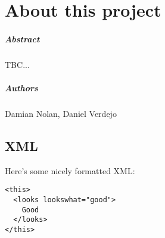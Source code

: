 
\chapter*{About this project}
\paragraph{Abstract}

TBC...

\paragraph{Authors}
Damian Nolan, Daniel Verdejo






\section{XML}
Here's some nicely formatted XML:
\begin{verbatim}
<this>
  <looks lookswhat="good">
    Good
  </looks>
</this>
\end{verbatim}





